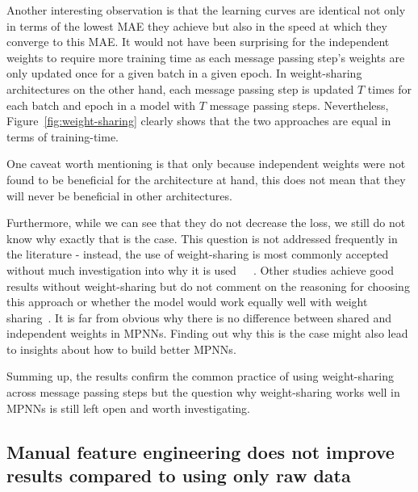 Another interesting observation is that the learning curves are identical not only in terms of the lowest MAE they achieve but also in the speed at which they converge to this MAE. It would not have been surprising for the independent weights to require more training time as each message passing step's weights are only updated once for a given batch in a given epoch. In weight-sharing architectures on the other hand, each message passing step is updated $T$ times for each batch and epoch in a model with $T$ message passing steps. Nevertheless, Figure~\ref{fig:weight-sharing} clearly shows that the two approaches are equal in terms of training-time.

One caveat worth mentioning is that only because independent weights were not found to be beneficial for the architecture at hand, this does not mean that they will never be beneficial in other architectures.

Furthermore, while we can see that they do not decrease the loss, we still do not know why exactly that is the case. This question is not addressed frequently in the literature - instead, the use of weight-sharing is most commonly accepted without much investigation into why it is used~\cite{Chen2019}~\cite{Schutt2017}~\cite{Klicpera2019}. Other studies achieve good results without weight-sharing but do not comment on the reasoning for choosing this approach or whether the model would work equally well with weight sharing~\cite{Jørgensen2018}. It is far from obvious why there is no difference between shared and independent weights in MPNNs. Finding out why this is the case might also lead to insights about how to build better MPNNs.  

Summing up, the results confirm the common practice of using weight-sharing across message passing steps but the question why weight-sharing works well in MPNNs is still left open and worth investigating.


\subsection{Manual feature engineering does not improve results compared to using only raw data}
\label{sec:raw-data}

